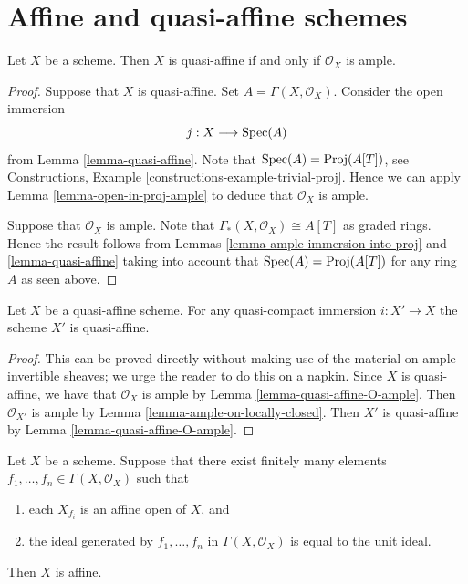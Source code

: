 \section{Affine and quasi-affine schemes}
\label{section-affine-quasi-affine}

\begin{lemma}
\label{lemma-quasi-affine-O-ample}
Let $X$ be a scheme.
Then $X$ is quasi-affine if and only if $\mathcal{O}_X$ is ample.
\end{lemma}

\begin{proof}
Suppose that $X$ is quasi-affine. Set $A = \Gamma(X, \mathcal{O}_X)$.
Consider the open immersion
$$
j : X \longrightarrow \mathop{\mathrm{Spec}}(A)
$$
from Lemma \ref{lemma-quasi-affine}. Note that
$\mathop{\mathrm{Spec}}(A) = \text{Proj}(A[T])$, see
Constructions, Example \ref{constructions-example-trivial-proj}.
Hence we can apply Lemma \ref{lemma-open-in-proj-ample}
to deduce that $\mathcal{O}_X$ is ample.

\medskip\noindent
Suppose that $\mathcal{O}_X$ is ample.
Note that $\Gamma_*(X, \mathcal{O}_X) \cong A[T]$
as graded rings. Hence the result follows from Lemmas
\ref{lemma-ample-immersion-into-proj} and \ref{lemma-quasi-affine}
taking into account that
$\mathop{\mathrm{Spec}}(A) = \text{Proj}(A[T])$ for any ring $A$
as seen above.
\end{proof}

\begin{lemma}
\label{lemma-quasi-affine-locally-closed}
Let $X$ be a quasi-affine scheme. For any quasi-compact immersion
$i : X' \to X$ the scheme $X'$ is quasi-affine.
\end{lemma}

\begin{proof}
This can be proved directly without making use of the material on
ample invertible sheaves; we urge the reader to do this on a napkin.
Since $X$ is quasi-affine, we have that $\mathcal{O}_X$ is ample by
Lemma \ref{lemma-quasi-affine-O-ample}.
Then $\mathcal{O}_{X'}$ is ample by
Lemma \ref{lemma-ample-on-locally-closed}. Then $X'$ is quasi-affine by
Lemma \ref{lemma-quasi-affine-O-ample}.
\end{proof}

\begin{lemma}
\label{lemma-characterize-affine}
Let $X$ be a scheme. Suppose that there exist finitely many elements
$f_1, \ldots, f_n \in \Gamma(X, \mathcal{O}_X)$ such that
\begin{enumerate}
\item each $X_{f_i}$ is an affine open of $X$, and
\item the ideal generated by $f_1, \ldots, f_n$ in
$\Gamma(X, \mathcal{O}_X)$ is equal to the unit ideal.
\end{enumerate}
Then $X$ is affine.
\end{lemma}

